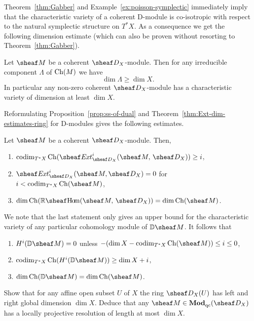 \documentclass[number-in-sections,a4paper]{notes}
\begin{document}
Theorem~\ref{thm:Gabber} and Example~\ref{ex:poisson-symplectic} immediately imply that the characteristic variety of a coherent D-module is co-isotropic with respect to the natural symplectic structure on $T^*X$.
As a consequence we get the following dimension estimate (which can also be proven without resorting to Theorem~\ref{thm:Gabber}).

\begin{Theorem}
    Let $\sheaf M$ be a coherent $\sD_X$-module.
    Then for any irreducible component $\Lambda$ of $\operatorname{Ch}(M)$ we have
    \[
        \dim \Lambda \ge \dim X.
    \]
    In particular any non-zero coherent $\sD_X$-module has a characteristic variety of dimension at least $\dim X$.
\end{Theorem}

Reformulating Proposition~\ref{prop:ss-of-dual} and Theorem~\ref{thm:Ext-dim-estimates-ring} for D-modules gives the following estimates.
\begin{Proposition}\label{prop:Ext-dim-estimates-ring}
    Let $\sheaf M$ be a coherent $\sD_X$-module.
    Then,
    \begin{enumerate}
        \item $\codim_{T^*X}\Ch(\sheafExt^i_{\sD_X}(\sheaf M,\, \sD_X)) \ge i$,
        \item $\sheafExt_{\sD_X}^i(\sheaf M, \sD_X) = 0$ for $i < \codim_{T^*X}\Ch(\sheaf M)$,
        \item $\dim \Ch(\RsheafHom(\sheaf M,\, \sD_X)) = \dim \Ch(\sheaf M)$.
    \end{enumerate}
\end{Proposition}

We note that the last statement only gives an upper bound for the characteristic variety of any particular cohomology module of $\DD\sheaf M$.
It follows that
\begin{enumerate}
    \item $H^i(\DD\sheaf M) = 0$ unless $-(\dim X-\codim_{T^*X}\Ch(\sheaf M)) \le i \le 0$,
    \item $\codim_{T^*X}\Ch(H^i(\DD\sheaf M)) \ge \dim X + i$,
    \item $\dim \Ch(\DD\sheaf M) = \dim \Ch(\sheaf M)$.
\end{enumerate}

\begin{Exercise}
    Show that for any affine open subset $U$ of $X$ the ring $\sD_X(U)$ has left and right global dimension $\dim X$.
    Deduce that any $\sheaf M \in \catDModqc{X}$ has a locally projective resolution of length at most $\dim X$.
\end{Exercise}
\end{document}

